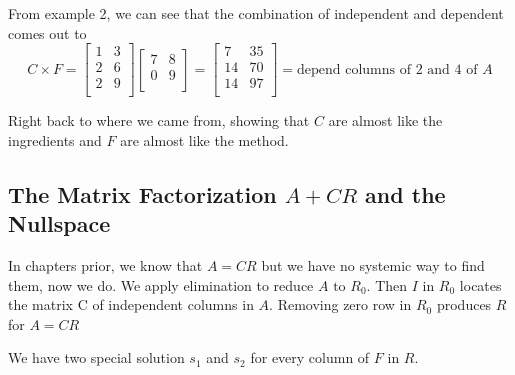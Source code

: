 From example 2, we can see that the combination of independent and dependent comes out to 
\[
    C \times F = 
    \begin{bmatrix}
        1 & 3  \\
        2 & 6  \\
        2 & 9  \\
    \end{bmatrix}
    \begin{bmatrix}
        7 & 8  \\
        0 & 9  \\
    \end{bmatrix}
    = 
    \begin{bmatrix}
        7 & 35  \\
        14 & 70  \\
        14 & 97  \\
    \end{bmatrix}
    =
    \text{depend columns of 2 and 4 of }A
\]

Right back to where we came from, showing that \(C\) are almost like the ingredients and \(F\) are almost like the method. 

\subsection{The Matrix Factorization \(A + CR\) and the Nullspace}

In chapters prior, we know that \(A = CR\) but we have no systemic way to find them, now we do. We apply elimination to reduce \(A \text{ to } R_0\). Then \(I\) in \(R_0\) locates the matrix C of independent columns in \(A\). Removing zero row in \(R_0\) produces \(R\) for \(A = CR\)

We have two special solution \(s_1\) and \(s_2\) for every column of \(F\) in \(R\).

